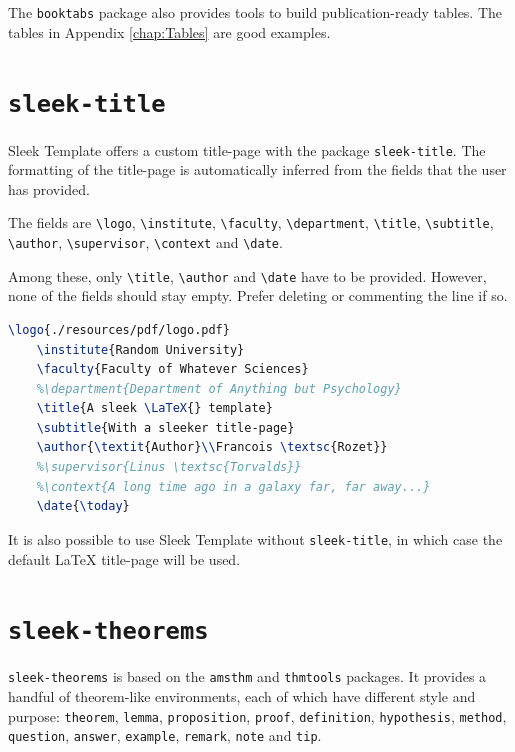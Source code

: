 \documentclass[a4paper, 12pt]{report}
\def\tbs{\textbackslash}
\begin{document}
    The \texttt{booktabs} package also provides tools to build publication-ready tables. The tables in Appendix \ref{chap:Tables} are good examples.

    \newpage

    \section{\texttt{sleek-title}}

    Sleek Template offers a custom title-page with the package \texttt{sleek-title}. The formatting of the title-page is automatically inferred from the fields that the user has provided.

    The fields are \texttt{\tbs{}logo}, \texttt{\tbs{}institute}, \texttt{\tbs{}faculty}, \texttt{\tbs{}department}, \texttt{\tbs{}title}, \texttt{\tbs{}subtitle}, \texttt{\tbs{}author}, \texttt{\tbs{}supervisor}, \texttt{\tbs{}context} and \texttt{\tbs{}date}.

    Among these, only \texttt{\tbs{}title}, \texttt{\tbs{}author} and \texttt{\tbs{}date} have to be provided. However, none of the fields should stay empty. Prefer deleting or commenting the line if so.

    \begin{lstlisting}[style=ruled, language=latex, caption={Example of \texttt{sleek-title} title-page definition.}, gobble=4]
    \logo{./resources/pdf/logo.pdf}
    \institute{Random University}
    \faculty{Faculty of Whatever Sciences}
    %\department{Department of Anything but Psychology}
    \title{A sleek \LaTeX{} template}
    \subtitle{With a sleeker title-page}
    \author{\textit{Author}\\Francois \textsc{Rozet}}
    %\supervisor{Linus \textsc{Torvalds}}
    %\context{A long time ago in a galaxy far, far away...}
    \date{\today}
    \end{lstlisting}

    It is also possible to use Sleek Template without \texttt{sleek-title}, in which case the default \LaTeX{} title-page will be used.

    \newpage

    \section{\texttt{sleek-theorems}}

    \texttt{sleek-theorems} is based on the \texttt{amsthm} and \texttt{thmtools} packages. It provides a handful of theorem-like environments, each of which have different style and purpose: \texttt{theorem}, \texttt{lemma}, \texttt{proposition}, \texttt{proof}, \texttt{definition}, \texttt{hypothesis}, \texttt{method}, \texttt{question}, \texttt{answer}, \texttt{example}, \texttt{remark}, \texttt{note} and \texttt{tip}.
\end{document}
